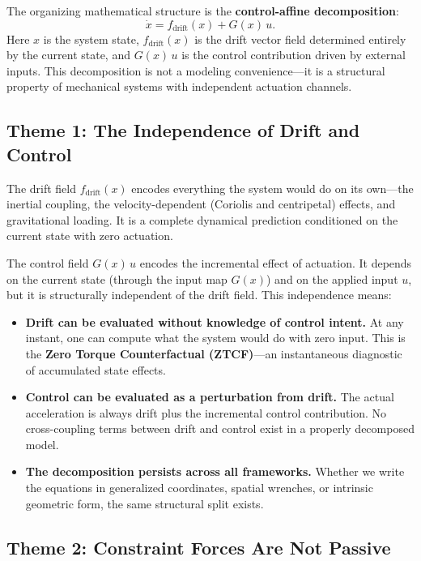 \documentclass[11pt]{article}
\begin{document}
The organizing mathematical structure is the \textbf{control-affine decomposition}:
\begin{equation}\label{eq:affine-master}
\dot{x} = f_{\mathrm{drift}}(x) + G(x)\,u.
\end{equation}
Here $x$ is the system state, $f_{\mathrm{drift}}(x)$ is the drift vector field determined entirely by the current state, and $G(x)\,u$ is the control contribution driven by external inputs.
This decomposition is not a modeling convenience---it is a structural property of mechanical systems with independent actuation channels.


\subsection{Theme 1: The Independence of Drift and Control}

The drift field $f_{\mathrm{drift}}(x)$ encodes everything the system would do on its own---the inertial coupling, the velocity-dependent (Coriolis and centripetal) effects, and gravitational loading.
It is a complete dynamical prediction conditioned on the current state with zero actuation.

The control field $G(x)\,u$ encodes the incremental effect of actuation.
It depends on the current state (through the input map $G(x)$) and on the applied input $u$, but it is structurally independent of the drift field.
This independence means:

\begin{itemize}
\item \textbf{Drift can be evaluated without knowledge of control intent.}
At any instant, one can compute what the system would do with zero input.
This is the \textbf{Zero Torque Counterfactual (ZTCF)}---an instantaneous diagnostic of accumulated state effects.

\item \textbf{Control can be evaluated as a perturbation from drift.}
The actual acceleration is always drift plus the incremental control contribution.
No cross-coupling terms between drift and control exist in a properly decomposed model.

\item \textbf{The decomposition persists across all frameworks.}
Whether we write the equations in generalized coordinates, spatial wrenches, or intrinsic geometric form, the same structural split exists.
\end{itemize}


\subsection{Theme 2: Constraint Forces Are Not Passive}
\end{document}

